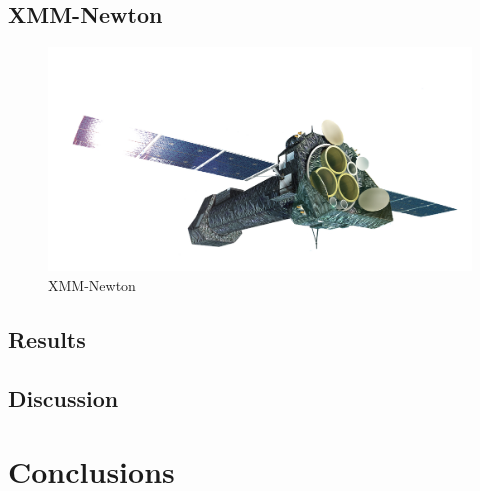 \documentclass[oneside,a4paper,11pt]{report}
\begin{document}
\section{XMM-Newton}

\begin{figure}[!hbt]
\centering
\includegraphics[totalheight=6cm]{XMM}
\caption{XMM-Newton }
\label{microblazar} 
\end{figure}


\section{Results}
\section{Discussion}
\chapter{Conclusions}



\end{document}
